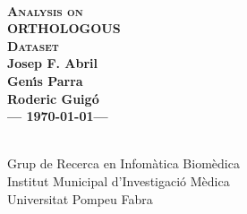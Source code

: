 \documentclass[11pt]{article}
\makeatletter
\let\nwdocspar=\par                    %
\def\mtjabril{\htmladdnormallink{\textbf{jabril@imim.es}}{MAILTO:jabril@imim.es?subject=[8SEQ ORTHOLOGOUS]}}
\makeatother
\begin{document}
\nwdocspar
\thispagestyle{empty}

\begin{titlepage}

\ \vfill
\begin{center}
\textsc{\textbf{\Huge Analysis on\\ ORTHOLOGOUS\\[1ex] Dataset}}\\[5ex]

\textbf{\Large Josep F. Abril}\\[1ex]
\textbf{\Large Gen\'{\i}s Parra}\\[1ex] %
\textbf{\Large Roderic Guig\'o}\\[5ex] %

\textbf{\large --- \today ---}\\[10ex]

\begin{abstract}
\begin{center}
\parbox{0.75\linewidth}{
} %
\end{center}
\end{abstract}

\vfill

\begin{raggedleft}
\\
Grup de Recerca en Infom\`atica Biom\`edica\\
Institut Municipal d'Investigaci\'o M\`edica\\
Universitat Pompeu Fabra\\[2ex]
\end{raggedleft}
\end{center}

\end{titlepage} %


\newpage
{}
\setcounter{page}{1}
\pagestyle{fancy}
\renewcommand{\sectionmark}[1]{\markboth{}{\thesection.\ #1}}
\renewcommand{\subsectionmark}[1]{\markboth{}{\thesubsection.\ \textsl{#1}}}
\end{document}
